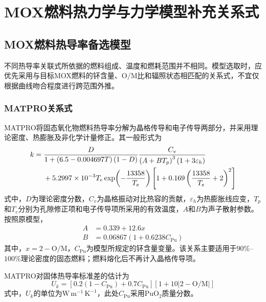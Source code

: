 \chapter{MOX燃料热力学与力学模型补充关系式}
\label{app:mox_supplementary_models}

\section{MOX燃料热导率备选模型}
\label{app:mox_thermal_conductivity_models}

不同热导率关联式所依据的燃料组成、温度和燃耗范围并不相同。模型选取时，应优先采用与目标MOX燃料的钚含量、O/M比和辐照状态相匹配的关系式，不宜仅根据曲线吻合程度进行跨范围外推。

\subsection{MATPRO关系式}

MATPRO将固态氧化物燃料热导率分解为晶格传导和电子传导两部分，并采用理论密度、热膨胀及非化学计量修正。其一般形式为
\begin{align}
	k={}&
	\frac{D}{1+\left(6.5-0.004697T\right)(1-D)}
	\frac{C_v}{\left(A+BT_p\right)^3\left(1+3\varepsilon_h\right)}
	\notag\\
	&+5.2997\times10^{-3}T_e
	\exp\!\left(-\frac{13358}{T_e}\right)
	\left[
	1+0.169\left(\frac{13358}{T_e}+2\right)^2
	\right]
	\label{eq:appendix_matpro_thermal_conductivity}
\end{align}
式中，$D$为理论密度分数，$C_v$为晶格振动对比热容的贡献，$\varepsilon_h$为热膨胀线应变，$T_p$和$T_e$分别为孔隙修正项和电子传导项所采用的有效温度，$A$和$B$为声子散射参数。按照原模型，
\begin{equation}
	\begin{aligned}
		A&=0.339+12.6x\\
				B&=0.06867\left(1+0.6238C_{\mathrm{Pu}}\right)
	\end{aligned}
	\label{eq:appendix_matpro_scattering_parameters}
\end{equation}
\label{eq:appendix_matpro_A}
\label{eq:appendix_matpro_B}
其中，$x=2-\mathrm{O/M}$，$C_{\mathrm{Pu}}$为模型所规定的钚含量变量。该关系主要适用于$90\%$--$100\%$理论密度的固态燃料；燃料熔化后不再计入晶格传导项。

MATPRO对固体热导率标准差的估计为
\begin{equation}
	U_k=
	\left[0.2(1-C_{\mathrm{Pu}})+0.7C_{\mathrm{Pu}}\right]
	\left[1+10\left|2-\mathrm{O/M}\right|\right]
	\label{eq:appendix_matpro_thermal_conductivity_uncertainty}
\end{equation}
式中，$U_k$的单位为$\mathrm{W\,m^{-1}\,K^{-1}}$，此处$C_{\mathrm{Pu}}$采用$\mathrm{PuO}_2$质量分数。

